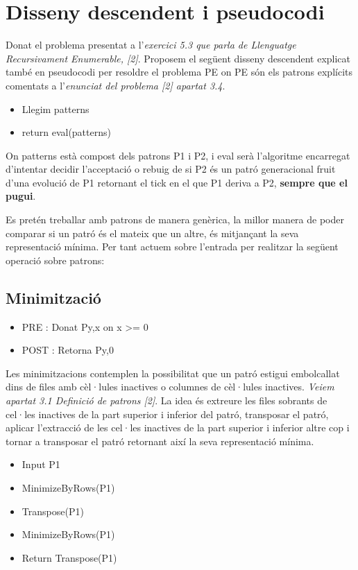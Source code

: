 \documentclass[12pt,a4paper]{report}
\begin{document}
\section{Disseny descendent i pseudocodi}

Donat el problema presentat a l’\textit{exercici 5.3 que parla de Llenguatge Recursivament Enumerable, [2]}. Proposem el següent disseny descendent explicat també en pseudocodi per resoldre el problema PE on PE són els patrons explícits comentats a l'\textit{enunciat del problema [2] apartat 3.4}.

\begin{itemize}
\item Llegim patterns
\item return eval(patterns)
\end{itemize}

On patterns està compost dels patrons P1 i P2, i eval serà l'algoritme encarregat d'intentar decidir l'acceptació o rebuig de si P2 és un patró generacional fruit d'una evolució de P1 retornant el tick en el que P1 deriva a P2, \textbf{sempre que el pugui}.

Es pretén treballar amb patrons de manera genèrica, la millor manera de poder comparar si un patró és el mateix que un altre, és mitjançant la seva representació mínima. Per tant actuem sobre l’entrada per realitzar la següent operació sobre patrons:

\subsection{Minimització}

\begin{itemize}
\item PRE : Donat Py,x on x >= 0
\item POST : Retorna Py,0
\end{itemize}

Les minimitzacions contemplen la possibilitat que un patró estigui embolcallat dins de files amb cèl·lules inactives o columnes de cèl·lules inactives. \textit{Veiem apartat 3.1 Definició de patrons [2]}. La idea és extreure les files sobrants de cel·les inactives de la part superior i inferior del patró, transposar el patró, aplicar l'extracció de les cel·les inactives de la part superior i inferior altre cop i tornar a transposar el patró retornant així la seva representació mínima.

\begin{itemize}
\item Input P1
\item MinimizeByRows(P1)
\item Transpose(P1)
\item MinimizeByRows(P1)
\item Return Transpose(P1)

\end{itemize}
\end{document}
